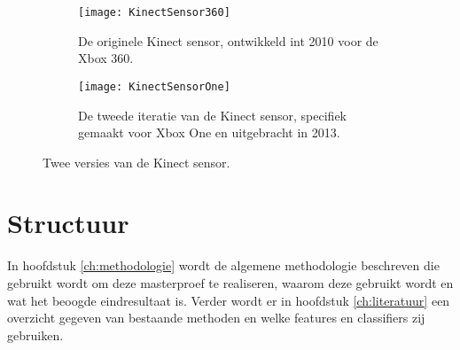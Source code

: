 \begin{figure}
	\begin{subfigure}[t]{0.48\textwidth}
		\texttt{[image: KinectSensor360]}
		\caption{De originele Kinect sensor, ontwikkeld int 2010 voor de Xbox 360.}
	\end{subfigure}
	\begin{subfigure}[t]{0.48\textwidth}
		\texttt{[image: KinectSensorOne]}
		\caption{De tweede iteratie van de Kinect sensor, specifiek gemaakt voor Xbox One en uitgebracht in 2013.}
		\label{fig:KinectSensorOne}
	\end{subfigure}
	\caption{Twee versies van de Kinect sensor.}
	\label{fig:KinectSensorVersies}
\end{figure}




\section{Structuur}
In hoofdstuk \ref{ch:methodologie} wordt de algemene methodologie beschreven die gebruikt wordt om deze masterproef te realiseren, waarom deze gebruikt wordt en wat het beoogde eindresultaat is. Verder wordt er in hoofdstuk \ref{ch:literatuur} een overzicht gegeven van bestaande methoden en welke features en classifiers zij gebruiken.
